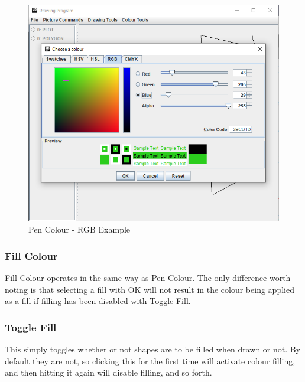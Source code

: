 \documentclass[12pt]{article} %
\begin{document}
\begin{figure}[H]
\caption{Pen Colour - RGB Example}
\centering
\includegraphics[scale=0.75]{pictures/colourSecondWindow.PNG}
\end{figure}

\subsubsection{Fill Colour}
Fill Colour operates in the same way as Pen Colour. The only difference worth noting is that selecting a fill with OK will not result in the colour being applied as a fill if filling has been disabled with Toggle Fill. 

\subsubsection{Toggle Fill}
This simply toggles whether or not shapes are to be filled when drawn or not. By default they are not, so clicking this for the first time will activate colour filling, and then hitting it again will disable filling, and so forth.
\end{document}
